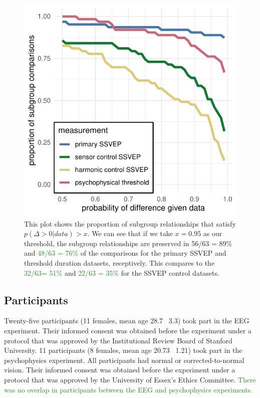 \documentclass[11pt, twoside]{article}
\begin{document}
\begin{figure}[tbp]
\centering
\includegraphics[width=0.5\linewidth]{../analysis/plots/model_roc_style.pdf}
\caption{This plot shows the proportion of subgroup relationships that satisfy $p(\Delta >0 | data) > x$. We can see that if we take $x = 0.95$ as our threshold, the subgroup relationships are preserved in 56/63 = 89\% and \textcolor{ForestGreen}{48/63 = 76\%} of the comparisons for the primary SSVEP and threshold duration datasets, receptively. This compares to the \textcolor{ForestGreen}{32/63= 51\%} and \textcolor{ForestGreen}{22/63 = 35\%} for the SSVEP control datasets.}
\label{fig:durations_rotations}
\end{figure}

\subsection*{Participants}
Twenty-five participants (11 females, mean age 28.7 \textpm\ 3.3) took part in the EEG experiment. Their informed consent was obtained before the experiment under a protocol that was approved by the Institutional Review Board of Stanford University. 11 participants (8 females, mean age 20.73 \textpm\ 1.21) took part in the psychophysics experiment. All participants had normal or corrected-to-normal vision. Their informed consent was obtained before the experiment under a protocol that was approved by the University of Essex's Ethics Committee. \textcolor{ForestGreen}{There was no overlap in participants between the EEG and psychophysics experiments.}
\end{document}
